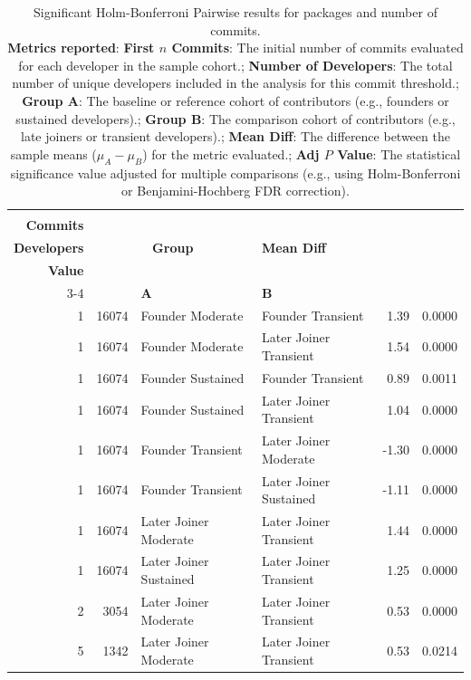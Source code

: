 \begin{table}[H]
\centering
\setlength{\tabcolsep}{2pt}
\caption[Significant Holm-Bonferroni Pairwise results for packages]{Significant Holm-Bonferroni Pairwise results for packages and number of commits. \\ \textbf{Metrics reported}:   \textbf{First $n$ Commits}: The initial number of commits evaluated for each developer in the sample cohort.;  \textbf{Number of Developers}: The total number of unique developers included in the analysis for this commit threshold.;  \textbf{Group A}: The baseline or reference cohort of contributors (e.g., founders or sustained developers).;  \textbf{Group B}: The comparison cohort of contributors (e.g., late joiners or transient developers).;  \textbf{Mean Diff}: The difference between the sample means ($\mu_A - \mu_B$) for the metric evaluated.;  \textbf{Adj $P$ Value}: The statistical significance value adjusted for multiple comparisons (e.g., using Holm-Bonferroni or Benjamini-Hochberg FDR correction).
}
\begin{tabular}{r r l l r r}
\toprule
\makecell[t]{\textbf{First $n$}\\\textbf{Commits}} & \makecell[t]{\textbf{Number of}\\\textbf{Developers}} & \multicolumn{2}{c}{\textbf{Group}} & \textbf{Mean Diff} & \makecell[t]{\textbf{Adj $P$}\\\textbf{Value}} \\ 
\cmidrule(lr){3-4}
 &  & \textbf{A} & \textbf{B} &  &  \\ 
\midrule
1 & 16074 & Founder Moderate & Founder Transient & 1.39 & 0.0000 \\ 
1 & 16074 & Founder Moderate & Later Joiner Transient & 1.54 & 0.0000 \\ 
1 & 16074 & Founder Sustained & Founder Transient & 0.89 & 0.0011 \\ 
1 & 16074 & Founder Sustained & Later Joiner Transient & 1.04 & 0.0000 \\ 
1 & 16074 & Founder Transient & Later Joiner Moderate & -1.30 & 0.0000 \\ 
1 & 16074 & Founder Transient & Later Joiner Sustained & -1.11 & 0.0000 \\ 
1 & 16074 & Later Joiner Moderate & Later Joiner Transient & 1.44 & 0.0000 \\ 
1 & 16074 & Later Joiner Sustained & Later Joiner Transient & 1.25 & 0.0000 \\ 
2 & 3054 & Later Joiner Moderate & Later Joiner Transient & 0.53 & 0.0000 \\ 
5 & 1342 & Later Joiner Moderate & Later Joiner Transient & 0.53 & 0.0214 \\ 
\bottomrule
\end{tabular}%
\label{tab:codebase_graph_latex_repository_graph_component_time_series_holm_bonferroni_sig_packages} 
\end{table}
